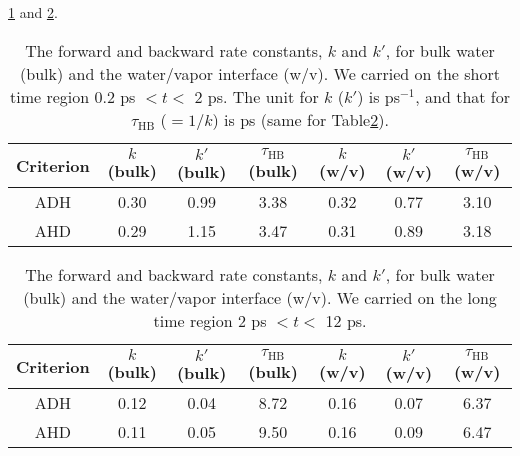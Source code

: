\ref{tab:k_k_prime_128w_pure_1} and \ref{tab:k_k_prime_128w_pure_2}. 
% 
\begin{table}[htb]
\centering
\caption{\label{tab:k_k_prime_128w_pure_1} 
    The forward and backward rate constants, $k$ and $k'$, for bulk water (bulk) and the water/vapor interface (w/v). We carried on the short time region 0.2 ps $< t <$ 2 ps. 
    The unit for $k$ ($k'$) is ps$^{-1}$, and that for $\tau_{\text{HB}}$ ($=1/k$) is ps (same for Table\thinspace\ref{tab:k_k_prime_128w_pure_2}).
} 
\begin{tabular}{ccccccc}
 Criterion & $k$  (bulk) & $k'$ (bulk) & $\tau_{\text{HB}}$ (bulk) & $k$  (w/v) & $k'$ (w/v) & $\tau_{\text{HB}}$ (w/v)\\
\hline
  ADH & 0.30  & 0.99 & 3.38  & 0.32 & 0.77 & 3.10 \\
  AHD & 0.29 & 1.15 & 3.47 & 0.31 & 0.89 & 3.18 \\
\end{tabular}
\end{table}
%
\begin{table}[htb]
\centering
\caption{\label{tab:k_k_prime_128w_pure_2} 
    The forward and backward rate constants, $k$ and $k'$, for bulk water (bulk) and the water/vapor interface (w/v). We carried on the long time region 2 ps $< t <$ 12 ps.
} 
\begin{tabular}{ccccccc}
 Criterion & $k$  (bulk) & $k'$ (bulk) & $\tau_{\text{HB}}$ (bulk) & $k$  (w/v) & $k'$ (w/v) & $\tau_{\text{HB}}$ (w/v)\\
\hline
  ADH & 0.12  & 0.04 & 8.72 & 0.16  & 0.07 & 6.37\\
  AHD & 0.11  & 0.05 & 9.50 & 0.16  & 0.09 & 6.47 \\
\end{tabular}
\end{table}
% 

